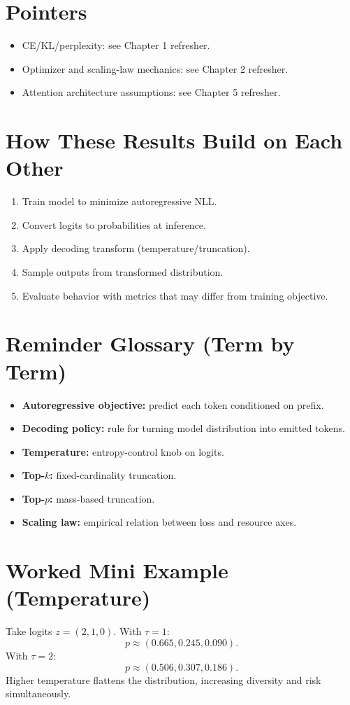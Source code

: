 \section*{Pointers}
\begin{itemize}[leftmargin=1.5em]
  \item CE/KL/perplexity: see Chapter 1 refresher.
  \item Optimizer and scaling-law mechanics: see Chapter 2 refresher.
  \item Attention architecture assumptions: see Chapter 5 refresher.
\end{itemize}

\section*{How These Results Build on Each Other}
\begin{enumerate}[leftmargin=1.5em]
  \item Train model to minimize autoregressive NLL.
  \item Convert logits to probabilities at inference.
  \item Apply decoding transform (temperature/truncation).
  \item Sample outputs from transformed distribution.
  \item Evaluate behavior with metrics that may differ from training objective.
\end{enumerate}

\section*{Reminder Glossary (Term by Term)}
\begin{itemize}[leftmargin=1.5em]
  \item \textbf{Autoregressive objective:} predict each token conditioned on prefix.
  \item \textbf{Decoding policy:} rule for turning model distribution into emitted tokens.
  \item \textbf{Temperature:} entropy-control knob on logits.
  \item \textbf{Top-$k$:} fixed-cardinality truncation.
  \item \textbf{Top-$p$:} mass-based truncation.
  \item \textbf{Scaling law:} empirical relation between loss and resource axes.
\end{itemize}

\section*{Worked Mini Example (Temperature)}
Take logits $z=(2,1,0)$.
With $\tau=1$:
\[
p\approx(0.665,0.245,0.090).
\]
With $\tau=2$:
\[
p\approx(0.506,0.307,0.186).
\]
Higher temperature flattens the distribution, increasing diversity and risk simultaneously.

